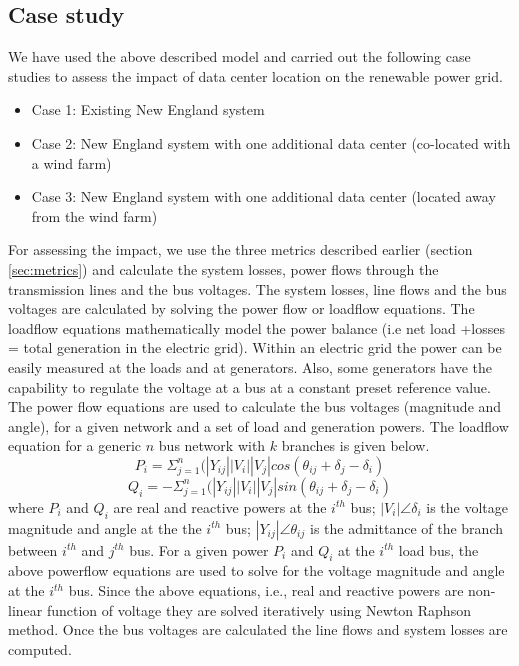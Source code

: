 \subsection{Case study}
We have used the above described model and carried out the following case studies to assess the impact of data center location on the renewable power grid.
\begin{itemize}
\item{Case 1: Existing New England system}
\item{Case 2: New England system with one additional data center (co-located with a wind farm)}
\item{Case 3: New England system with one additional data center (located away from the wind farm)}
\end{itemize}
For assessing the impact, we use the three metrics described earlier (section \ref{sec:metrics}) and calculate the system losses, power flows through the transmission lines and the bus voltages.
The system losses, line flows and the bus voltages are calculated by solving the power flow or loadflow equations. The loadflow equations mathematically model the power balance (i.e net load +losses = total generation in the electric grid). Within an electric grid the power can be easily measured at the loads and at generators. Also, some generators have the capability to regulate the voltage at a bus at a constant preset reference value. The power flow equations are used to calculate the bus voltages (magnitude and angle), for a given network and a set of load and generation powers. The loadflow equation for a generic $n$ bus network with $k$ branches is given below.
\begin{equation}
P_{i} = \Sigma_{j=1}^{n}(|Y_{ij}||V_{i}||V_{j}|cos(\theta_{ij}+\delta_{j}-\delta_{i})
\end{equation}
\begin{equation}
Q_{i} = -\Sigma_{j=1}^{n}(|Y_{ij}||V_{i}||V_{j}|sin(\theta_{ij}+\delta_{j}-\delta_{i})
\end{equation}
where $P_{i}$ and $Q_{i}$ are real and reactive powers at the $i^{th}$ bus; $|V_{i}| \angle \delta_{i}$ is the voltage magnitude and angle at the the $i^{th}$ bus; $|Y_{ij}| \angle \theta_{ij}$ is the admittance of the branch between $i^{th}$ and $j^{th}$ bus.
For a given power $P_{i}$ and $Q_{i}$ at the $i^{th}$ load bus, the above powerflow equations are used to solve for the voltage magnitude and angle at the $i^{th}$ bus. Since the above equations, i.e., real and reactive powers are non-linear function of voltage they are solved iteratively using Newton Raphson method. Once the bus voltages are calculated the line flows and system losses are computed.
